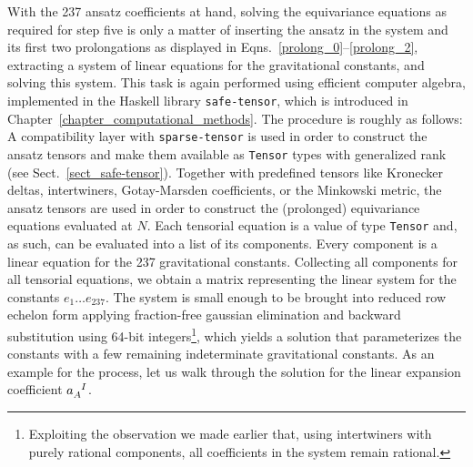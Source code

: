 With the 237 ansatz coefficients at hand, solving the equivariance equations as required for step five is only a matter of inserting the ansatz in the system and its first two prolongations as displayed in Eqns.~\eqref{prolong_0}--\eqref{prolong_2}, extracting a system of linear equations for the gravitational constants, and solving this system. This task is again performed using efficient computer algebra, implemented in the Haskell library \texttt{safe-tensor}, which is introduced in Chapter~\ref{chapter_computational_methods}. The procedure is roughly as follows: A compatibility layer with \texttt{sparse-tensor} is used in order to construct the ansatz tensors and make them available as \texttt{Tensor} types with generalized rank (see Sect.~\ref{sect_safe-tensor}). Together with predefined tensors like Kronecker deltas, intertwiners, Gotay-Marsden coefficients, or the Minkowski metric, the ansatz tensors are used in order to construct the (prolonged) equivariance equations evaluated at $N$. Each tensorial equation is a value of type \texttt{Tensor} and, as such, can be evaluated into a list of its components. Every component is a linear equation for the 237 gravitational constants. Collecting all components for all tensorial equations, we obtain a matrix representing the linear system for the constants $e_1\dots e_{237}$. The system is small enough to be brought into reduced row echelon form applying fraction-free gaussian elimination and backward substitution using 64-bit integers\footnote{Exploiting the observation we made earlier that, using intertwiners with purely rational components, all coefficients in the system remain rational.}, which yields a solution that parameterizes the constants with a few remaining indeterminate gravitational constants. As an example for the process, let us walk through the solution for the linear expansion coefficient $a_A^{\hphantom AI}$.

